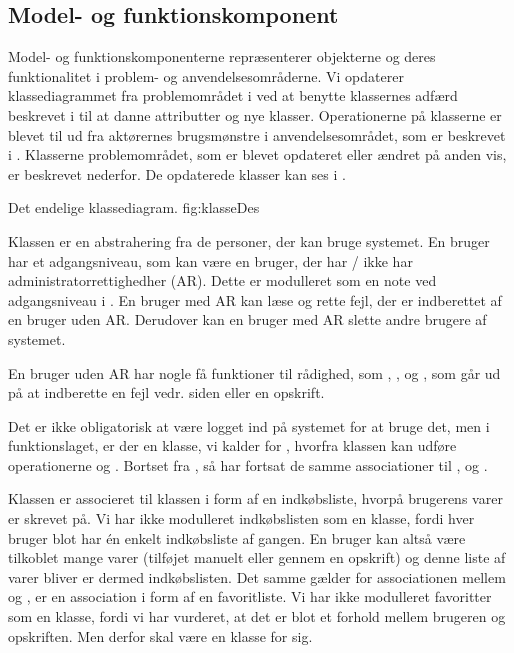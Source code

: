 \subsection{Model- og funktionskomponent}
\label{sec:modelfunktion}

Model- og funktionskomponenterne repræsenterer objekterne og deres funktionalitet i problem- og anvendelsesområderne. Vi opdaterer klassediagrammet fra problemområdet i  ved at benytte klassernes adfærd beskrevet i  til at danne attributter og nye klasser. Operationerne på klasserne er blevet til ud fra aktørernes brugsmønstre i anvendelsesområdet, som er beskrevet i . Klasserne problemområdet, som er blevet opdateret eller ændret på anden vis, er beskrevet nederfor. De opdaterede klasser kan ses i .


	{Det endelige klassediagram.}
	{fig:klasseDes}


Klassen  er en abstrahering fra de personer, der kan bruge systemet. En bruger har et adgangsniveau, som kan være en bruger, der har / ikke har administratorrettighedher (AR). Dette er modulleret som en note ved adgangsniveau i . En bruger med AR kan læse og rette fejl, der er indberettet af en bruger uden AR. Derudover kan en bruger med AR slette andre brugere af systemet.

En bruger uden AR har nogle få funktioner til rådighed, som \fx {}, ,  og , som går ud på at indberette en fejl vedr. siden eller en opskrift.

Det er ikke obligatorisk at være logget ind på systemet for at bruge det, men i funktionslaget, er der en klasse, vi kalder for , hvorfra klassen  kan udføre operationerne  og . Bortset fra , så har  fortsat de samme associationer til ,  og . 

Klassen  er associeret til klassen  i form af en indkøbsliste, hvorpå brugerens varer er skrevet på. Vi har ikke modulleret indkøbslisten som en klasse, fordi hver bruger blot har én enkelt indkøbsliste af gangen. En bruger kan altså være tilkoblet mange varer (tilføjet manuelt eller gennem en opskrift) og denne liste af varer bliver er dermed indkøbslisten. Det samme gælder for associationen mellem  og , er en association i form af en favoritliste. Vi har ikke modulleret favoritter som en klasse, fordi vi har vurderet, at det er blot et forhold mellem brugeren og opskriften. Men derfor skal  være en klasse for sig.

